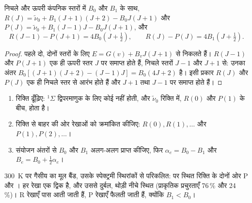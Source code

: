 \begin{theorem}[संयोजन अंतर]\label{thm:b3:rovibrational-spectroscopy:combination-differences}
निचले और ऊपरी कंपनिक स्तरों में  $B_0$ और $B_1$ के साथ,
$R(J) = \tilde\nu_0 + B_1(J+1)(J+2) - B_0J(J+1)$ और $P(J) = \tilde\nu_0 +
B_1(J-1)J - B_0J(J+1)$, और
\[
R(J - 1) - P(J + 1) = 4B_0(J + \tfrac12), \qquad R(J) - P(J) = 4B_1(J + \tfrac12).
\]
\end{theorem}

\begin{proof}
पहले दो, दोनों स्तरों के लिए $E = G(v) + B_vJ(J+1)$ से निकलते हैं। $R(J - 1)$ और
$P(J + 1)$ एक ही ऊपरी स्तर $J$ पर समाप्त होते हैं, निचले स्तरों $J - 1$ और $J + 1$ से:
उनका अंतर $B_0[(J+1)(J+2) - (J-1)J] = B_0(4J + 2)$ है। इसी प्रकार $R(J)$ और
$P(J)$ एक ही निचले स्तर से आरंभ होते हैं और $J + 1$ तथा $J - 1$ पर समाप्त होते हैं।
\end{proof}

\begin{method}[घूर्णी-कंपनिक बैंड का विश्लेषण]\label{met:b3:rovibrational-spectroscopy:combination}
\begin{enumerate}
  \item रिक्ति ढूँढ़िए: ${}^1\Sigma$ द्विपरमाणुक के लिए कोई  नहीं होती, और
        $\tilde\nu_0$ रिक्ति में, $R(0)$ और $P(1)$ के बीच, होता है।
  \item रिक्ति से बाहर की ओर रेखाओं को क्रमांकित कीजिए: $R(0), R(1), \dots$ और $P(1),
        P(2), \dots$।
  \item संयोजन अंतरों से $B_0$ और $B_1$
        अलग-अलग प्राप्त कीजिए, फिर $\alpha_e = B_0 - B_1$ और $B_e = B_0 + \frac12\alpha_e$।
\end{enumerate}
\end{method}

\begin{omfigure}

{\small \qty{300}{K} पर गैसीय  का मूल बैंड, उसके स्पेक्ट्रमी स्थिरांकों से
परिकलित:  पर स्थित रिक्ति के दोनों ओर P और । हर रेखा एक द्विक है,
 और उससे दुर्बल, थोड़ी नीचे स्थित
 (प्राकृतिक प्रचुरताएँ 76\,\% और 24\,\%)। R रेखाएँ पास आती जाती हैं,
P रेखाएँ फैलती जाती हैं, क्योंकि $B_1 < B_0$।}
\end{omfigure}

